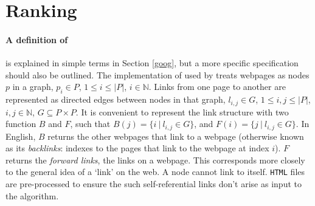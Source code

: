 \section{Ranking\label{rank}}
\paragraph{A definition of \pr{}}
\pr{} \cite{page1999} is explained in simple terms in Section
\ref{goog}, but a more specific specification should also be outlined.
The implementation of \pr{} used by \nr{} treats webpages as nodes $p$ in
a graph, $p_i \in P$, $1 \le i \le |P|$, $i \in \mathbb{N}$.  Links from one page to another
are represented as directed edges between nodes in that graph,
$l_{i,j} \in G$, $1 \le i, j \le |P|$, $i, j \in \mathbb{N}$, $G \subseteq P \times P$.  
It is convenient to represent the link structure with two function $B$
and $F$, such that $B(j) = \{i~|~l_{i, j} \in G\}$, and
$F(i) = \{j~|~l_{i, j} \in G\}$.
In English, $B$ returns
the other webpages that link to a webpage (otherwise known as its
{\it backlinks}: indexes to the pages that
link to the webpage at index $i$).  $F$ returns the {\it forward links},
the links on a webpage.  This corresponds more closely to the general
idea of a `link' on the web.  A node cannot link to itself.  {\tt HTML}
files are pre-processed to ensure the such self-referential links don't
arise as input to the algorithm.

